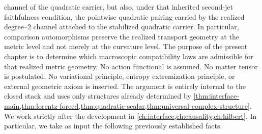 channel of the quadratic carrier, but also, under that inherited
second-jet faithfulness condition, the pointwise quadratic pairing
carried by the realized degree--\(2\) channel attached to the
stabilized quadratic carrier.
In particular, comparison automorphisms preserve the realized transport
geometry at the metric level and not merely at the curvature level.
The purpose of the present chapter is to determine which macroscopic
compatibility laws are admissible for that realized metric geometry.
No action functional is assumed.
No matter tensor is postulated.
No variational principle, entropy extremization principle, or external
geometric axiom is inserted.
The argument is entirely internal to the closed stack and uses only
structures already determined by
\cref{thm:interface-main,thm:lorentz-forced,thm:quadratic-scalar,thm:universal-complex-structure}.
We work strictly after the development in
\cref{ch:interface,ch:causality,ch:hilbert}.
In particular, we take as input the following previously established
facts.
